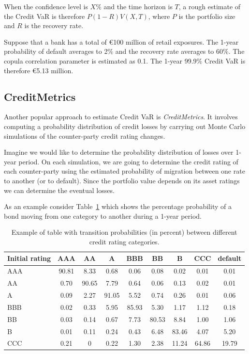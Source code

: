 When the confidence level is $X\%$ and the time horizon is $T$, a rough estimate of the Credit VaR is therefore $P(1-R)V(X,T)$, where $P$ is the portfolio size and $R$ is the recovery rate.

Suppose that a bank has a total of \euro{100} million of retail exposures. The 1-year probability of default averages to 2\% and the recovery rate averages to 60\%. The copula correlation parameter is estimated as 0.1.
The 1-year 99.9\% Credit VaR is therefore \euro{5.13} million.

\subsection{CreditMetrics}
Another popular approach to estimate Credit VaR is \emph{CreditMetrics}. It involves computing a probability distribution of credit losses by carrying out Monte Carlo simulations of the counter-party credit rating changes.

Imagine we would like to determine the probability distribution of losses over 1-year period. On each simulation, we are going to determine the credit rating of each counter-party using the estimated probability of migration between one rate to another (or to default). Since the portfolio value depends on its asset ratings we can determine the eventual losses. 

As an example consider Table~\ref{tab:credit_ratings} which shows the percentage probability of a bond moving from one category to another during a 1-year period.

\begin{table}[htb]
\centering
\begin{tabular}{|l|c|c|c|c|c|c|c|c|}
\hline
Initial rating & AAA & AA & A & BBB & BB & B & CCC & default \\
\hline
\hline
AAA & 90.81 & 8.33 & 0.68 & 0.06 & 0.08 & 0.02 & 0.01& 0.01 \\ 
\hline
AA & 0.70 & 90.65 & 7.79 & 0.64 & 0.06 & 0.13 & 0.02 & 0.01 \\ 
\hline
A & 0.09 & 2.27 & 91.05 & 5.52 & 0.74 & 0.26 & 0.01 & 0.06 \\ 
\hline
BBB & 0.02 & 0.33 & 5.95 & 85.93 & 5.30 & 1.17 & 1.12 & 0.18 \\
\hline
BB & 0.03 & 0.14 & 0.67 & 7.73 & 80.53 & 8.84 & 1.00 & 1.06 \\
\hline
B & 0.01 & 0.11 & 0.24 & 0.43 & 6.48 & 83.46 & 4.07 & 5.20 \\
\hline
CCC & 0.21 & 0 & 0.22 & 1.30 & 2.38 & 11.24 & 64.86 & 19.79 \\		
\hline
\end{tabular}
\caption{Example of table with transition probabilities (in percent) between different credit rating categories.}
\label{tab:credit_ratings}
\end{table}

